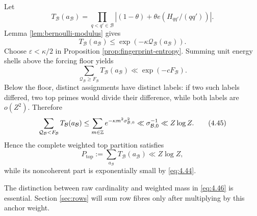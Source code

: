 Let
\[
T_{\mathcal B}(a_{\mathcal B})
=
\prod_{q<q'\in\mathcal B}
\left|(1-\theta)+\theta e(H_{qq'}/(qq'))\right|.
\tag{4.42}\label{eq:4.42}
\]
Lemma \ref{lem:bernoulli-modulus} gives
\[
T_{\mathcal B}(a_{\mathcal B})
\le
\exp(-\kappa\mathcal Q_{\mathcal B}(a_{\mathcal B})).
\tag{4.43}\label{eq:4.43}
\]
Choose $\varepsilon<\kappa/2$ in Proposition \ref{prop:fingerprint-entropy}. Summing unit energy shells above the forcing floor yields
\[
\sum_{\mathcal Q_{\mathcal B}\ge F_{\mathcal B}}
T_{\mathcal B}(a_{\mathcal B})
\ll
\exp(-cF_{\mathcal B}).
\tag{4.44}\label{eq:4.44}
\]
Below the floor, distinct assignments have distinct labels: if two such labels differed, two top primes would divide their difference, while both labels are $o(Z^2)$. Therefore
\[
\sum_{\mathcal Q_{\mathcal B}<F_{\mathcal B}}
T_{\mathcal B}(a_{\mathcal B})
\le
\sum_{m\in\mathbb Z}
 e^{-\kappa m^2\sigma_{\mathcal B,0}^2}
\ll
\sigma_{\mathcal B,0}^{-1}
\ll Z\log Z.
\tag{4.45}\label{eq:4.45}
\]
Hence the complete weighted top partition satisfies
\[
P_{\mathrm{top}}
:=
\sum_{a_{\mathcal B}}T_{\mathcal B}(a_{\mathcal B})
\ll Z\log Z,
\tag{4.46}\label{eq:4.46}
\]
while its noncoherent part is exponentially small by \eqref{eq:4.44}.

The distinction between raw cardinality and weighted mass in \eqref{eq:4.46} is essential. Section \ref{sec:rows} will sum row fibres only after multiplying by this anchor weight.